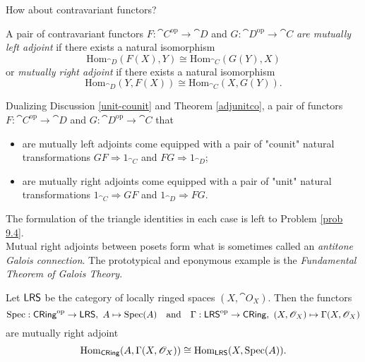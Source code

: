 How about contravariant functors?
\begin{definition}
A pair of contravariant functors $F:\cat{C}^{\text{op}} \to \cat{D}$ and $G:\cat{D}^{\text{op}} \to \cat{C}$ \emph{are mutually left adjoint} if there exists a natural isomorphism
\[\mathrm{Hom}_{\cat{D}}(F(X),Y) \cong \mathrm{Hom}_{\cat{C}}(G(Y),X)\]
or \emph{mutually right adjoint} if there exists a natural isomorphism
\[\mathrm{Hom}_{\cat{D}}(Y,F(X)) \cong \mathrm{Hom}_{\cat{C}}(X,G(Y)).\]

Dualizing Discussion \ref{unit-counit} and Theorem \ref{adjunitco}, a pair of functors $F:\cat{C}^{\text{op}} \to \cat{D}$ and $G:\cat{D}^{\text{op}} \to \cat{C}$ that
\begin{itemize}
\item are mutually left adjoints come equipped with a pair of "counit" natural transformations $GF \Rightarrow 1_{\cat{C}}$ and $FG \Rightarrow 1_{\cat{D}}$;
\item are mutually right adjoints come equipped with a pair of "unit" natural transformations $1_{\cat{C}} \Rightarrow GF$ and $1_{\cat{D}} \Rightarrow FG$.
\end{itemize}
The formulation of the triangle identities in each case is left to Problem \ref{prob 9.4}.\\[1em]
Mutual right adjoints between posets form what is sometimes called an \emph{antitone Galois connection}. The prototypical and eponymous example is the \emph{Fundamental Theorem of Galois Theory}.
\end{definition}

\vspace*{0.1in}

\begin{example}\label{spec-global}
Let $\mathsf{LRS}$ be the category of locally ringed spaces $(X,\cat{O}_X)$. Then the functors
\[\mathrm{Spec}:\mathsf{CRing}^{\text{op}} \to \mathsf{LRS},\ A \mapsto \mathrm{Spec}(A)\quad \text{and}\quad \Gamma:\mathsf{LRS}^{\text{op}} \to \mathsf{CRing},\ (X,\mathscr{O}_X) \mapsto \Gamma(X,\mathscr{O}_X)\]
are mutually right adjoint
\[\mathrm{Hom}_{\mathsf{CRing}}(A,\Gamma(X,\mathscr{O}_X)) \cong \mathrm{Hom}_{\mathsf{LRS}}(X,\mathrm{Spec}(A)).\]
\end{example}

\vspace*{0.1in}

